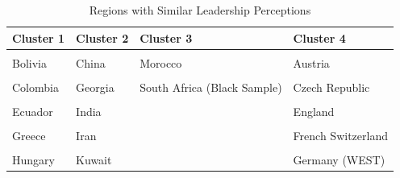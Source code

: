\documentclass[
]{article}
\begin{document}
\begin{table}[h]

\caption{\label{tab:country_table}Regions with Similar Leadership Perceptions}
\centering
\begin{tabular}[t]{>{}l>{}l>{}l>{}l}
\toprule
Cluster 1 & Cluster 2 & Cluster 3 & Cluster 4\\
\midrule
\textcolor[HTML]{739999}{\cellcolor{gray!6}{Argentina}} & \textcolor[HTML]{000026}{\cellcolor{gray!6}{Albania}} & \textcolor[HTML]{407326}{\cellcolor{gray!6}{France}} & \textcolor[HTML]{BF7300}{\cellcolor{gray!6}{Australia}}\\
\textcolor[HTML]{739999}{Bolivia} & \textcolor[HTML]{000026}{China} & \textcolor[HTML]{407326}{Morocco} & \textcolor[HTML]{BF7300}{Austria}\\
\textcolor[HTML]{739999}{\cellcolor{gray!6}{Brazil}} & \textcolor[HTML]{000026}{\cellcolor{gray!6}{Egypt}} & \textcolor[HTML]{407326}{\cellcolor{gray!6}{Qatar}} & \textcolor[HTML]{BF7300}{\cellcolor{gray!6}{Canada (English-speaking)}}\\
\textcolor[HTML]{739999}{Colombia} & \textcolor[HTML]{000026}{Georgia} & \textcolor[HTML]{407326}{South Africa (Black Sample)} & \textcolor[HTML]{BF7300}{Czech Republic}\\
\textcolor[HTML]{739999}{\cellcolor{gray!6}{Costa Rica}} & \textcolor[HTML]{000026}{\cellcolor{gray!6}{Hong Kong}} & \textcolor[HTML]{407326}{\cellcolor{gray!6}{}} & \textcolor[HTML]{BF7300}{\cellcolor{gray!6}{Denmark}}\\
\addlinespace
\textcolor[HTML]{739999}{Ecuador} & \textcolor[HTML]{000026}{India} & \textcolor[HTML]{407326}{} & \textcolor[HTML]{BF7300}{England}\\
\textcolor[HTML]{739999}{\cellcolor{gray!6}{El Salvador}} & \textcolor[HTML]{000026}{\cellcolor{gray!6}{Indonesia}} & \textcolor[HTML]{407326}{\cellcolor{gray!6}{}} & \textcolor[HTML]{BF7300}{\cellcolor{gray!6}{Finland}}\\
\textcolor[HTML]{739999}{Greece} & \textcolor[HTML]{000026}{Iran} & \textcolor[HTML]{407326}{} & \textcolor[HTML]{BF7300}{French Switzerland}\\
\textcolor[HTML]{739999}{\cellcolor{gray!6}{Guatemala}} & \textcolor[HTML]{000026}{\cellcolor{gray!6}{Japan}} & \textcolor[HTML]{407326}{\cellcolor{gray!6}{}} & \textcolor[HTML]{BF7300}{\cellcolor{gray!6}{Germany (EAST)}}\\
\textcolor[HTML]{739999}{Hungary} & \textcolor[HTML]{000026}{Kuwait} & \textcolor[HTML]{407326}{} & \textcolor[HTML]{BF7300}{Germany (WEST)}\\

\end{tabular}
\end{table}
\end{document}
